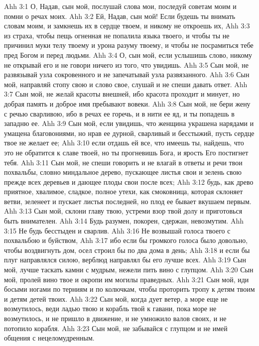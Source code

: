 \vs Ahh 3:1
О, Надав, сын мой, послушай слова мои, последуй советам моим и помни о речах моих.
\vs Ahh 3:2
Ей, Надав, сын мой! Если будешь ты внимать словам моим, и замкнешь их в сердце твоем, и никому не откроешь их,
\vs Ahh 3:3
из страха, чтобы пещь огненная не попалила языка твоего, и чтобы ты не причинил муки телу твоему и урона разуму твоему, и чтобы не посрамиться тебе пред Богом и перед людьми.
\vs Ahh 3:4
О, сын мой, если услышишь слово, никому не открывай его и не говори ничего из того, что увидишь.
\vs Ahh 3:5
Сын мой, не развязывай узла сокровенного и не запечатывай узла развязанного.
\vs Ahh 3:6
Сын мой, направляй стопу свою и слово свое, слушай и не спеши давать ответ.
\vs Ahh 3:7
Сын мой, не желай красоты внешней, ибо красота проходит и минует, но добрая память и доброе имя пребывают вовеки.
\vs Ahh 3:8
Сын мой, не бери жену с речью сварливою, ибо в речах ее горечь, и в нити ее яд, и ты попадешь в западню ее.
\vs Ahh 3:9
Сын мой, если увидишь, что женщина украшена нарядами и умащена благовониями, но нрав ее дурной, сварливый и бесстыжий, пусть сердце твое не желает ее;
\vs Ahh 3:10
если отдашь ей все, что имеешь ты, найдешь, что это не обратится к славе твоей, но ты прогневишь Бога, и ярость Его постигнет тебя.
\vs Ahh 3:11
Сын мой, не спеши говорить и не влагай в ответы и речи твои похвальбы, словно миндальное дерево, пускающее листья свои и зелень свою прежде всех деревьев и дающее плоды свои после всех;
\vs Ahh 3:12
будь, как древо приятное, хвалимое, сладкое, полное утехи, как смоковница, которая склоняет ветви, зеленеет и пускает листья последней, но плод ее бывает вкушаем первым.
\vs Ahh 3:13
Сын мой, склони главу твою, устреми взор твой долу и приготовься быть внимателен.
\vs Ahh 3:14
Будь разумен, покорен, сдержан, невозмутим.
\vs Ahh 3:15
Не будь бесстыден и сварлив.
\vs Ahh 3:16
Не возвышай голоса твоего с похвальбою и буйством,
\vs Ahh 3:17
ибо если бы громкого голоса было довольно, чтобы воздвигнуть дом, осел строил бы по два дома в день;
\vs Ahh 3:18
и если бы плуг направлялся силою, верблюд направлял бы его лучше всех.
\vs Ahh 3:19
Сын мой, лучше таскать камни с мудрым, нежели пить вино с глупцом.
\vs Ahh 3:20
Сын мой, пролей вино твое и окропи им могилы праведных.
\vs Ahh 3:21
Сын мой, иди босыми ногами по терниям и по колючкам, чтобы проторить тропу к детям твоим и детям детей твоих.
\vs Ahh 3:22
Сын мой, когда дует ветер, а море еще не возмутилось, веди ладью твою и корабль твой к гавани, пока море не возмутилось, и не пришло в движение, и не умножило валов своих, и не потопило корабля.
\vs Ahh 3:23
Сын мой, не забывайся с глупцом и не имей общения с нецеломудренным.

